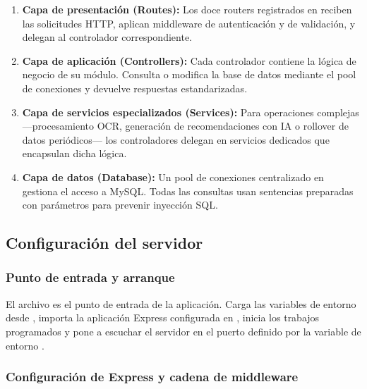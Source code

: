 \begin{enumerate}
  \item \textbf{Capa de presentación (Routes):} Los doce routers
    registrados en  reciben las solicitudes HTTP,
    aplican middleware de autenticación y de validación, y delegan al
    controlador correspondiente.

  \item \textbf{Capa de aplicación (Controllers):} Cada controlador
    contiene la lógica de negocio de su módulo. Consulta o modifica la
    base de datos mediante el pool de conexiones y devuelve respuestas
    estandarizadas.

  \item \textbf{Capa de servicios especializados (Services):} Para
    operaciones complejas —procesamiento OCR, generación de
    recomendaciones con IA o rollover de datos periódicos— los
    controladores delegan en servicios dedicados que encapsulan dicha
    lógica.

  \item \textbf{Capa de datos (Database):} Un pool de conexiones
    centralizado en  gestiona el acceso a
    MySQL. Todas las consultas usan sentencias preparadas con
    parámetros para prevenir inyección SQL.
\end{enumerate}

\subsection{Configuración del servidor}

\subsubsection{Punto de entrada y arranque}

El archivo  es el punto de entrada de la
aplicación. Carga las variables de entorno desde ,
importa la aplicación Express configurada en ,
inicia los trabajos programados y pone a escuchar el servidor en
el puerto definido por la variable de entorno .

\subsubsection{Configuración de Express y cadena de middleware}

